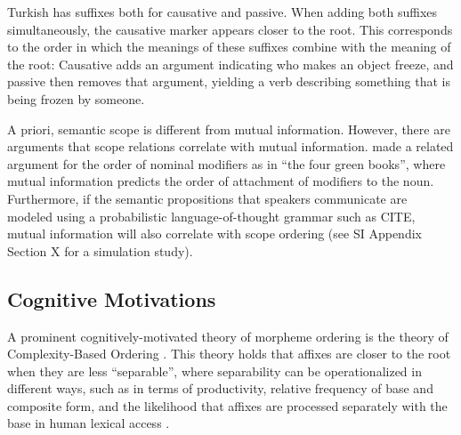 \documentclass[11pt,letterpaper]{article}
\newcommand{\citep}{\parencite}
\newcommand{\citet}{\Textcite}
\begin{document}
Turkish has suffixes both for causative and passive.
When adding both suffixes simultaneously, the causative marker appears closer to the root.
This corresponds to the order in which the meanings of these suffixes combine with the meaning of the root:
Causative adds an argument indicating who makes an object freeze, and passive then removes that argument, yielding a verb describing something that is being frozen by someone.

A priori, semantic scope is different from mutual information.
However, there are arguments that scope relations correlate with mutual information.
\citet{culbertson2020from} made a related argument for the order of nominal modifiers as in ``the four green books'', where mutual information predicts the order of attachment of modifiers to the noun.
Furthermore, if the semantic propositions that speakers communicate are modeled using a probabilistic language-of-thought grammar such as CITE, mutual information will also correlate with scope ordering (see SI Appendix Section X for a simulation study).




\subsection{Cognitive Motivations}

A prominent cognitively-motivated theory of morpheme ordering is the theory of Complexity-Based Ordering \citep{hay2002speech,plag2002the,hay2004what,hay2005shifting,plag2009suffix}.
This theory holds that affixes are closer to the root when they are less ``separable'', where separability can be operationalized in different ways, such as in terms of productivity, relative frequency of base and composite form, and the likelihood that affixes are processed separately with the base in human lexical access  \citep{baayen1993on}.

\end{document}
